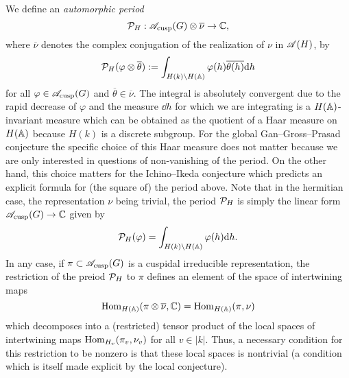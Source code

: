 We define an \emph{automorphic period}
\[
    \mathcal{P}_H: \mathscr{A}_{\mathrm{cusp}}(G) \otimes \overline{\nu} \to \mathbb{C},
\]
where $\overline{\nu}$ denotes the complex conjugation of the realization of $\nu$ in $\mathscr{A}(H)$, by
\[
    \mathcal{P}_H(\varphi \otimes \overline{\theta}) := \int_{H(k) \backslash H(\mathbb{A})} \varphi(h) \overline{\theta(h)} \mathrm{d} h
\]
for all $\varphi \in \mathscr{A}_{\mathrm{cusp}}(G)$ and $\overline{\theta} \in \overline{\nu}$.
The integral is absolutely convergent due to the rapid decrease of $\varphi$ and the measure $\dd h$ for which we are integrating is a $H(\mathbb{A})$-invariant measure which can be obtained as the quotient of a Haar measure on $H(\mathbb{A})$ because $H(k)$ is a discrete subgroup.
For the global Gan--Gross--Prasad conjecture the specific choice of this Haar measure does not matter because we are only interested in questions of non-vanishing of the period.
On the other hand, this choice matters for the Ichino--Ikeda conjecture which predicts an explicit formula for (the square of) the period above.
Note that in the hermitian case, the representation $\nu$ being trivial, the period $\mathcal{P}_H$ is simply the linear form $\mathscr{A}_{\mathrm{cusp}}(G) \to \mathbb{C}$ given by
\[
    \mathcal{P}_H(\varphi) = \int_{H(k) \backslash H(\mathbb{A})} \varphi(h) \mathrm{d} h.
\]
In any case, if $\pi \subset \mathscr{A}_{\mathrm{cusp}}(G)$ is a cuspidal irreducible representation, the restriction of the preiod $\mathcal{P}_H$ to $\pi$ defines an element of the space of intertwining maps
\[
    \mathrm{Hom}_{H(\mathbb{A})}(\pi \otimes \overline{\nu}, \mathbb{C}) = \mathrm{Hom}_{H(\mathbb{A})}(\pi, \nu)
\]
which decomposes into a (restricted) tensor product of the local spaces of intertwining maps $\mathrm{Hom}_{H_v}(\pi_v, \nu_v)$ for all $v \in |k|$.
Thus, a necessary condition for this restriction to be nonzero is that these local spaces is nontrivial (a condition which is itself made explicit by the local conjecture).

